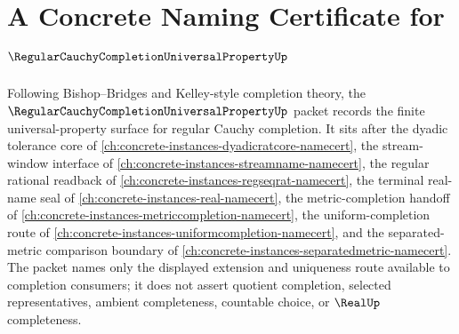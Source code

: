 \chapter{A Concrete Naming Certificate for $\RegularCauchyCompletionUniversalPropertyUp$}
\label{ch:concrete-instances-regular-cauchy-completion-universal-property-namecert}

Following Bishop--Bridges and Kelley-style completion theory, the $\RegularCauchyCompletionUniversalPropertyUp$ packet records the finite universal-property surface for regular Cauchy completion. It sits after the dyadic tolerance core of \autoref{ch:concrete-instances-dyadicratcore-namecert}, the stream-window interface of \autoref{ch:concrete-instances-streamname-namecert}, the regular rational readback of \autoref{ch:concrete-instances-regseqrat-namecert}, the terminal real-name seal of \autoref{ch:concrete-instances-real-namecert}, the metric-completion handoff of \autoref{ch:concrete-instances-metriccompletion-namecert}, the uniform-completion route of \autoref{ch:concrete-instances-uniformcompletion-namecert}, and the separated-metric comparison boundary of \autoref{ch:concrete-instances-separatedmetric-namecert}. The packet names only the displayed extension and uniqueness route available to completion consumers; it does not assert quotient completion, selected representatives, ambient completeness, countable choice, or $\RealUp$ completeness.


